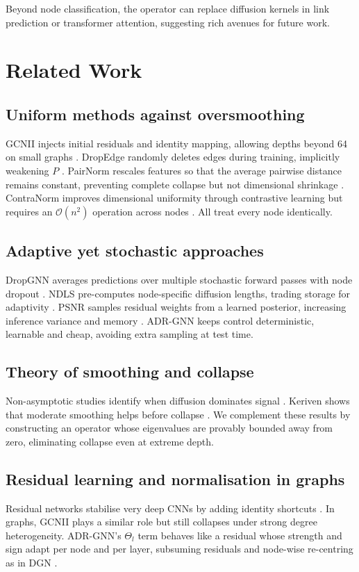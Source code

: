 \documentclass{article}
\begin{document}
Beyond node classification, the operator can replace diffusion kernels in link prediction or transformer attention, suggesting rich avenues for future work.

\section{Related Work}
\subsection{Uniform methods against oversmoothing}
GCNII injects initial residuals and identity mapping, allowing depths beyond 64 on small graphs \cite{chen-2020-simple}. DropEdge randomly deletes edges during training, implicitly weakening \(P\) \cite{rong-2019-dropedge}. PairNorm rescales features so that the average pairwise distance remains constant, preventing complete collapse but not dimensional shrinkage \cite{zhao-2019-pairnorm}. ContraNorm improves dimensional uniformity through contrastive learning but requires an \(\mathcal{O}(n^2)\) operation across nodes \cite{guo-2023-contranorm}. All treat every node identically.

\subsection{Adaptive yet stochastic approaches}
DropGNN averages predictions over multiple stochastic forward passes with node dropout \cite{papp-2021-dropgnn}. NDLS pre-computes node-specific diffusion lengths, trading storage for adaptivity \cite{zhang-2021-node}. PSNR samples residual weights from a learned posterior, increasing inference variance and memory \cite{zhou-2023-deep}. ADR-GNN keeps control deterministic, learnable and cheap, avoiding extra sampling at test time.

\subsection{Theory of smoothing and collapse}
Non-asymptotic studies identify when diffusion dominates signal \cite{wu-2022-non}. Keriven shows that moderate smoothing helps before collapse \cite{keriven-2022-not}. We complement these results by constructing an operator whose eigenvalues are provably bounded away from zero, eliminating collapse even at extreme depth.

\subsection{Residual learning and normalisation in graphs}
Residual networks stabilise very deep CNNs by adding identity shortcuts \cite{he-2015-deep}. In graphs, GCNII plays a similar role but still collapses under strong degree heterogeneity. ADR-GNN’s \(\Theta_l\) term behaves like a residual whose strength and sign adapt per node and per layer, subsuming residuals and node-wise re-centring as in DGN \cite{zhou-2020-towards}.
\end{document}
